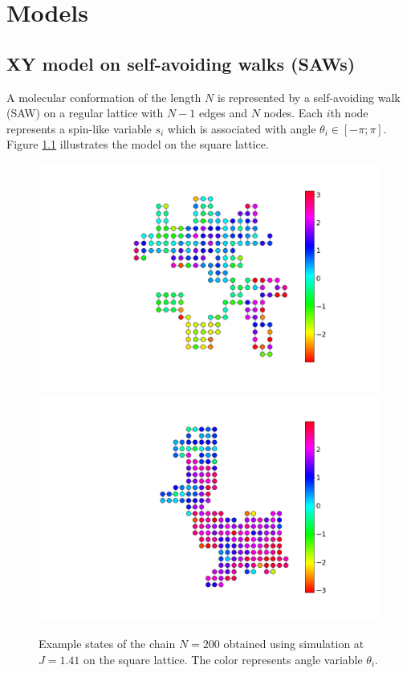 \chapter{Models} \label{sec:model}

\section{XY model on self-avoiding walks (SAWs)} \label{sec:xymodel}

A molecular conformation of the length $N$ is represented by a self-avoiding walk (SAW) on a regular lattice with $N-1$ edges and $N$ nodes.  Each $i$th node represents a spin-like variable $s_i$ which is associated with angle $\theta_i \in  [-\pi;\pi]$. Figure \ref{fig:example} illustrates the model on the square lattice. 

 \begin{figure}[H]
	\centering
	\includegraphics[scale=0.20]{Images/state_example.png}
	\includegraphics[scale=0.20]{Images/state_example1.png}
	\caption{ Example states of the  chain $N=200$ obtained using simulation at $J=1.41$ on the square lattice. The color represents angle variable $\theta_i$. }
	\label{fig:example}
\end{figure}


